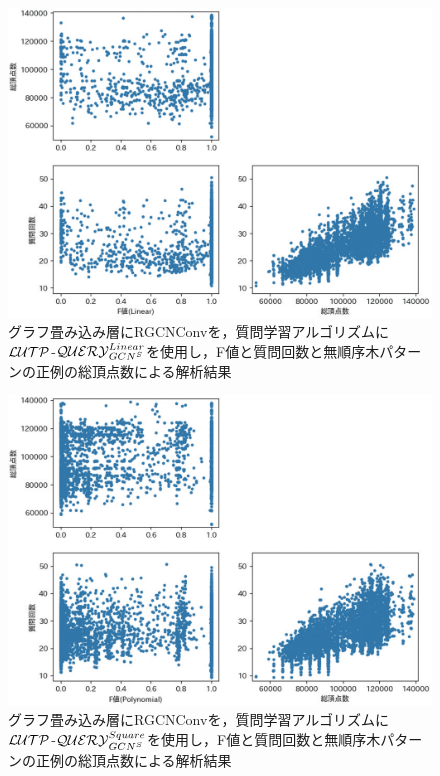 \begin{figure}[tb]
  \centering
  \includegraphics[scale=0.66]{fig/fig-RGCNConv_ln_ql_f1_nodes.eps}
  \caption{グラフ畳み込み層にRGCNConvを，質問学習アルゴリズムに${\cal LUTP}$-${\cal QUERY}_{GCN^S}^{Linear}$を使用し，F値と質問回数と無順序木パターンの正例の総頂点数による解析結果}\label{fig:RGCNConv_ln_ql_f1_nodes}
\end{figure}

\begin{figure}[tb]
  \centering
  \includegraphics[scale=0.66]{fig/fig-RGCNConv_sqr_ql_f1_nodes.eps}
  \caption{グラフ畳み込み層にRGCNConvを，質問学習アルゴリズムに${\cal LUTP}$-${\cal QUERY}_{GCN^S}^{Square}$を使用し，F値と質問回数と無順序木パターンの正例の総頂点数による解析結果}\label{fig:RGCNConv_sqr_ql_f1_nodes}
\end{figure}

